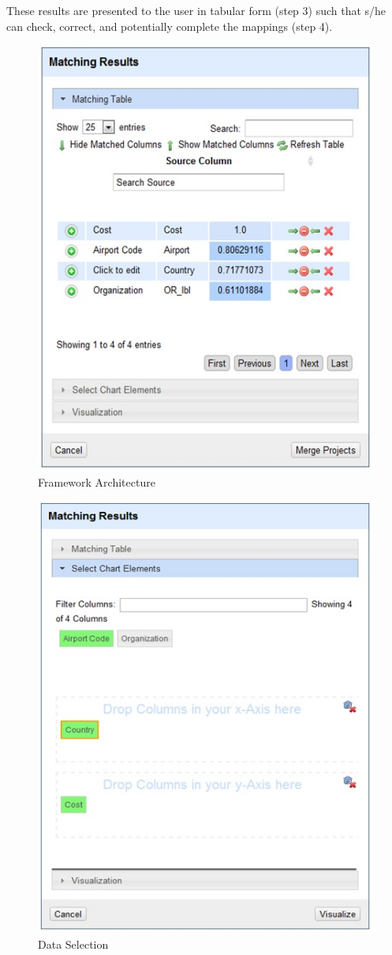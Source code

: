 \documentclass{sig-alternate}
\begin{document}
These results are presented to the user in tabular form (step 3) such that s/he can check, correct, and potentially complete the mappings (step 4).
\begin{figure}[ht!]
  \centering
    \includegraphics[scale=0.6]{1.jpg} 
  \caption{Framework Architecture}
\end{figure}
\begin{figure}[ht!]
  \centering
    \includegraphics[scale=0.6]{2.jpg} 
  \caption{Data Selection}
\end{figure}
\end{document}

